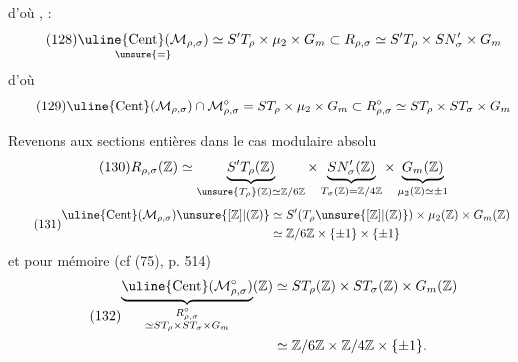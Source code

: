 

d'où , :
\[
\tag{128}
\underset{\unsure{=}}{\uline{\mathrm{Cent}}(\mathcal M_{\rho,\sigma})}
\simeq S'T_\rho\times\mu_2\times G_m
\subset R_{\rho,\sigma}\simeq S'T_\rho\times SN'_\sigma\times G_m
\]
d'où
\[
\tag{129}
\uline{\mathrm{Cent}}(\mathcal M_{\rho,\sigma})\cap\mathcal M_{\rho,\sigma}^{\circ}
=ST_\rho\times\mu_2\times G_m
\subset R_{\rho,\sigma}^{\circ}\simeq ST_\rho\times ST_\sigma\times G_m
\]

Revenons aux sections entières dans le cas modulaire absolu
\[
\tag{130}
R_{\rho,\sigma}(\mathbb Z)\simeq
\underbrace{S'T_\rho(\mathbb Z)}_{\unsure{T_\rho}(\mathbb Z)\simeq\mathbb Z/6\mathbb Z}
\times
\underbrace{SN'_\sigma(\mathbb Z)}_{T_\sigma(\mathbb Z)=\mathbb Z/4\mathbb Z}
\times
\underbrace{G_m(\mathbb Z)}_{\mu_2(\mathbb Z)\simeq\pm1}
\]
\[
\tag{131}
\begin{aligned}
\uline{\mathrm{Cent}}(\mathcal M_{\rho,\sigma})\unsure{[\mathbb Z]|(\mathbb Z)}
&\simeq S'(T_\rho\unsure{[\mathbb Z]|(\mathbb Z)})\times\mu_2(\mathbb Z)\times G_m(\mathbb Z)\\
&\simeq\mathbb Z/6\mathbb Z\times\{\pm1\}\times\{\pm1\}
\end{aligned}
\]
et pour mémoire (cf (75), p. 514)
\[
\tag{132}
\begin{aligned}
\underbrace{\uline{\mathrm{Cent}}(\mathcal M_{\rho,\sigma}^{\circ})}_{\substack{R_{\rho,\sigma}^{\circ}\\\simeq ST_\rho\times ST_\sigma\times G_m}}(\mathbb Z)
&\simeq ST_\rho(\mathbb Z)\times ST_\sigma(\mathbb Z)\times G_m(\mathbb Z)\\
&\simeq\mathbb Z/6\mathbb Z\times\mathbb Z/4\mathbb Z\times\{\pm1\}.
\end{aligned}
\]

